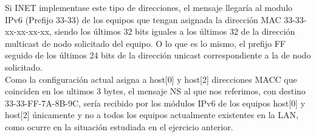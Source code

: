 Si INET implementase este tipo de direcciones, el mensaje llegaría al modulo IPv6 (Prefijo 33-33) de los equipos que tengan asignada la dirección MAC 33-33-xx-xx-xx-xx, siendo los últimos 32 bits iguales a los últimos 32 de la dirección multicast de nodo solicitado del equipo. O lo que es lo mismo, el prefijo FF seguido de los últimos 24 bits de la dirección unicast correspondiente a la de nodo solicitado. \\
Como la configuración actual asigna a host[0] y host[2] direcciones MACC que coinciden en los ultimos 3 bytes, el mensaje NS al que nos referimos, con destino 33-33-FF-7A-8B-9C, sería recibido por los módulos IPv6 de los equipos host[0] y host[2] únicamente y no a todos los equipos actualmente existentes en la LAN, como ocurre en la situación estudiada en el ejercicio anterior.
